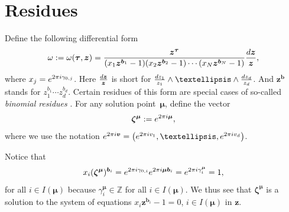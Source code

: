 \documentclass[11pt]{article}
\numberwithin{equation}{section}
\numberwithin{equation}{section}
\begin{document}
\section{Residues}
\label{chap-res}
Define the following differential form
\begin{gather*}
\omega := \omega(\bm{\tau},\bm{z}) = \frac{\bm{z}^{\bm\tau}}{(x_1\bm{z}^{\bm{b}_1} - 1)(x_2\bm{z}^{\bm{b}_2} - 1) \cdots (x_N\bm{z}^{\bm{b}_N} - 1)} \frac{{\rm d}\bm{z}}{\bm{z}},
\end{gather*}
where $x_j={\rm e}^{2\pi {\rm i}\gamma_{0,j}}$.
Here $\frac{{\rm d}\bm{z}}{\bm{z}}$ is short for $\frac{{\rm d}z_1}{z_1} \wedge \dots \wedge \frac{{\rm d}z_d}{z_d}$. And $\bm{z}^{\bm{b}}$ stands for $z_1^{b_1}\cdots z_d^{b_d}$.
Certain residues of this form are special cases of so-called {\it binomial residues} \cite{Cat00}.
For any solution point~$\bm{\mu}$, define the vector
\begin{gather*}
\bm{\zeta}^{\bm{\mu}} := {\rm e}^{2\pi {\rm i} \bm{\mu}},
\end{gather*}
where we use the notation ${\rm e}^{2\pi {\rm i}\bm{v}}=\big({\rm e}^{2\pi {\rm i}v_1},\dots,{\rm e}^{2\pi {\rm i}v_d}\big)$.

Notice that
\begin{gather*}
x_i (\bm{\zeta}^{\bm{\mu}})^{\bm{b}_i}={\rm e}^{2\pi {\rm i}\gamma_{0,i}}
{\rm e}^{2\pi {\rm i}\bm{\mu}\bm{b}_i}={\rm e}^{2\pi {\rm i}\gamma^{\bm{\mu}}_i}=1,
\end{gather*}
for all $i\in I(\bm{\mu})$ because $\gamma^{\bm\mu}_i\in\mathbb{Z}$ for all $i\in I(\bm\mu)$.
We thus see that $\bm{\zeta}^{\bm\mu}$ is a solution to the system of equations
$x_i\bm{z}^{\bm{b}_i}-1=0$, $i\in I(\bm\mu)$ in $\bm{z}$.
\end{document}
